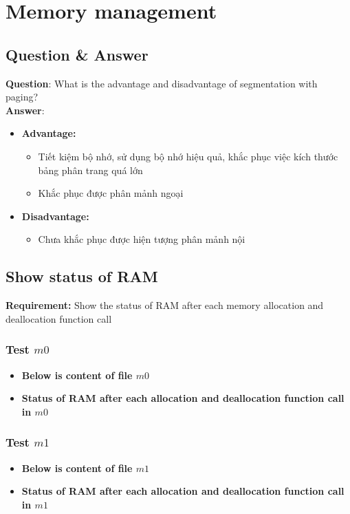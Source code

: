 \newpage
\section{Memory management}
\subsection{Question \& Answer}
\textbf{Question}: What is the advantage and disadvantage of segmentation with paging?\\
\textbf{Answer}:
\begin{itemize}
	\item \textbf{Advantage:}
		\begin{itemize}
			\item Tiết kiệm bộ nhớ, sử dụng bộ nhớ hiệu quả, khắc phục việc kích thước bảng phân trang quá lớn
			\item Khắc phục được phân mảnh ngoại
		\end{itemize}
	\item \textbf{Disadvantage:}
		\begin{itemize}
			\item Chưa khắc phục được hiện tượng phân mảnh nội
		\end{itemize}
\end{itemize}
\subsection{Show status of RAM}
\textbf{Requirement:} Show the status of RAM after each memory allocation and deallocation function call
\subsubsection{Test $ m0 $}
\begin{itemize}
	\item \textbf{Below is content of file $ m0 $}
		
	\item \textbf{Status of RAM after each allocation and deallocation function call in $ m0 $}
		
\end{itemize}
\subsubsection{Test $ m1 $}
\begin{itemize}
	\item \textbf{Below is content of file $ m1 $}
		
	\item \textbf{Status of RAM after each allocation and deallocation function call in $ m1 $}
		
\end{itemize}